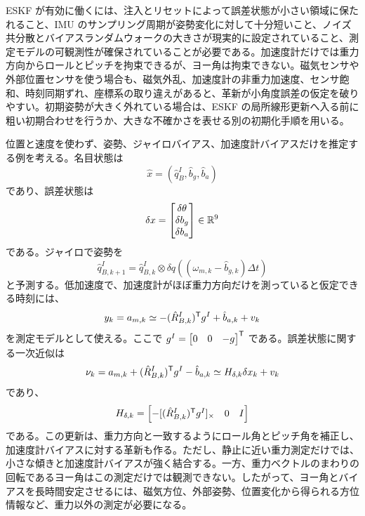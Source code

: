 ESKF が有効に働くには、注入とリセットによって誤差状態が小さい領域に保たれること、IMU のサンプリング周期が姿勢変化に対して十分短いこと、ノイズ共分散とバイアスランダムウォークの大きさが現実的に設定されていること、測定モデルの可観測性が確保されていることが必要である。加速度計だけでは重力方向からロールとピッチを拘束できるが、ヨー角は拘束できない。磁気センサや外部位置センサを使う場合も、磁気外乱、加速度計の非重力加速度、センサ飽和、時刻同期ずれ、座標系の取り違えがあると、革新が小角度誤差の仮定を破りやすい。初期姿勢が大きく外れている場合は、ESKF の局所線形更新へ入る前に粗い初期合わせを行うか、大きな不確かさを表せる別の初期化手順を用いる。

\begin{example}
位置と速度を使わず、姿勢、ジャイロバイアス、加速度計バイアスだけを推定する例を考える。名目状態は
\begin{equation}
  \hat{x}=(\hat{q}^I_B,\hat{b}_g,\hat{b}_a)
\end{equation}
であり、誤差状態は
\begin{equation}
  \delta x=
  \begin{bmatrix}
    \delta\theta\\
    \delta b_g\\
    \delta b_a
  \end{bmatrix}
  \in\mathbb{R}^9
\end{equation}
である。ジャイロで姿勢を
\begin{equation}
  \hat{q}^I_{B,k+1}
  =
  \hat{q}^I_{B,k}\otimes
  \delta q\left((\omega_{m,k}-\hat{b}_{g,k})\Delta t\right)
\end{equation}
と予測する。低加速度で、加速度計がほぼ重力方向だけを測っていると仮定できる時刻には、
\begin{equation}
  y_k=a_{m,k}
  \simeq
  -(\hat{R}^I_{B,k})^{\mathsf{T}} g^I+\hat{b}_{a,k}+v_k
\end{equation}
を測定モデルとして使える。ここで $g^I=\begin{bmatrix}0&0&-g\end{bmatrix}^{\mathsf{T}}$ である。誤差状態に関する一次近似は
\begin{equation}
  \nu_k
  =
  a_{m,k}
  +(\hat{R}^I_{B,k})^{\mathsf{T}} g^I-\hat{b}_{a,k}
  \simeq
  H_{\delta,k}\delta x_k+v_k
\end{equation}
であり、
\begin{equation}
  H_{\delta,k}
  =
  \begin{bmatrix}
    -[(\hat{R}^I_{B,k})^{\mathsf{T}} g^I]_\times
    &0&I
  \end{bmatrix}
\end{equation}
である。この更新は、重力方向と一致するようにロール角とピッチ角を補正し、加速度計バイアスに対する革新も作る。ただし、静止に近い重力測定だけでは、小さな傾きと加速度計バイアスが強く結合する。一方、重力ベクトルのまわりの回転であるヨー角はこの測定だけでは観測できない。したがって、ヨー角とバイアスを長時間安定させるには、磁気方位、外部姿勢、位置変化から得られる方位情報など、重力以外の測定が必要になる。
\end{example}

